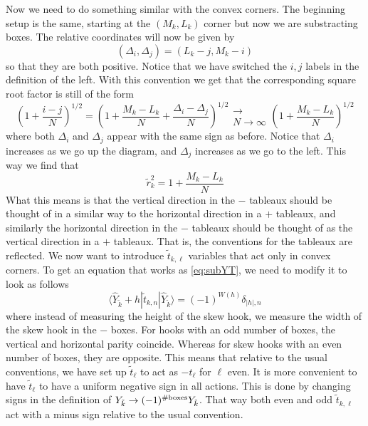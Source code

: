 \documentclass[12pt,nofootinbib, longbibliography]{revtex4-1}
\newcommand\ket[1]{| #1\rangle}
\newcommand\bra[1]{\langle #1|}
\begin{document}
Now we need to do something similar with the convex corners. The beginning setup is the same, starting at the $(M_k,L_k)$ corner  but now we are substracting boxes. The relative coordinates will now be given by
\begin{equation}
(\Delta_i, \Delta_j)= (L_k-j,M_k-i)
\end{equation} 
so that they are both positive.
Notice that we have switched the $i,j$ labels in the definition of the left. With this convention we get that the corresponding square root factor is still of the form
\begin{equation}
\left(1+\frac{i-j}N\right)^{1/2}= \left(1+\frac{M_k-L_k}N + \frac{\Delta_i - \Delta _j}N\right)^{1/2}{\substack{\longrightarrow\\N\to \infty}} \left(1+\frac{M_k-L_k}N \right)^{1/2}\label{eq:simpli2}
\end{equation}
where both $\Delta_i$ and $\Delta_j$ appear with the same sign as before. Notice that $\Delta_i$ increases as we go up the diagram, and $\Delta_j$ increases as we go to the left.
This way we find that 
\begin{equation}
\tilde r_k^2 = 1+\frac{M_k-L_{k}}N
\end{equation}
What this means is that the vertical direction in the $-$ tableaux should be thought of in a similar way to the horizontal direction in a $+$ tableaux, and similarly the horizontal direction in the $-$ tableaux should be thought of as the vertical direction in a $+$ tableaux. That is, the conventions for the tableaux are reflected.
We now want to introduce $\tilde t_{k, \ell}$ variables that act only in convex corners.
To get an equation that works as \eqref{eq:subYT}, we need to modify it to look as follows
\begin{equation}
\bra{\hat Y_{\tilde k}+h} \tilde t_{k,n} \ket{\hat Y_{\tilde k}} = (-1)^{W(h)} \delta_{|h|,n}\label{eq:subYTtrans}
\end{equation}
where instead of measuring the height of the skew hook, we measure the width of the skew hook in the $-$ boxes. 
 For hooks with an odd number of boxes, the vertical and horizontal parity coincide. 
Whereas for skew hooks with an even number of boxes, they are opposite. This means that relative to the usual conventions, we have set up $\tilde t_\ell$ to act as $-t_\ell$ for $\ell$ even. It is more convenient to have $\tilde t_{\ell}$ to have a uniform negative sign in all actions. This is done by changing signs in the definition of $Y_{\tilde k}\to (-1)^{\# \rm{boxes}} Y_{\tilde k}$. That way both even and odd $\tilde t_{k,\ell}$ act with a minus sign relative to the usual convention. 
\end{document}
